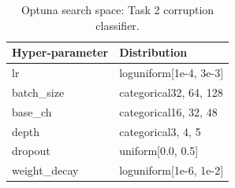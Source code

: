 \begin{table}[t]
\centering
\caption{Optuna search space: Task 2 corruption classifier.}
\label{tab:optuna_cls_space}
\footnotesize
\begin{tabular}{ll}
\toprule
Hyper-parameter & Distribution \\
\midrule
lr & loguniform[1e-4, 3e-3] \\
batch\_size & categorical{32, 64, 128} \\
base\_ch & categorical{16, 32, 48} \\
depth & categorical{3, 4, 5} \\
dropout & uniform[0.0, 0.5] \\
weight\_decay & loguniform[1e-6, 1e-2] \\
\bottomrule
\end{tabular}
\end{table}
